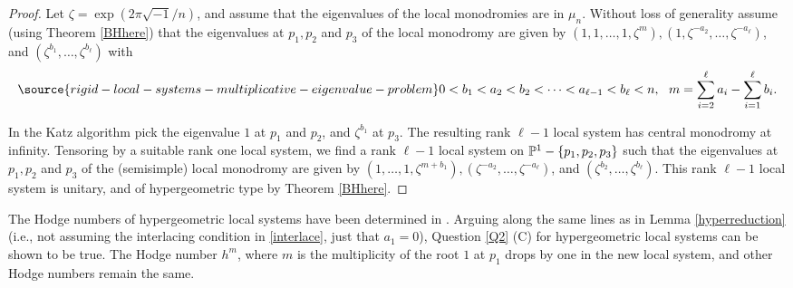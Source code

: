  \begin{proof}
Let $\zeta=\exp(2\pi\sqrt{-1}/n)$, and assume that the eigenvalues of the local monodromies are in $\mu_n$.  Without loss of generality assume (using Theorem \ref{BHhere}) that the eigenvalues at $p_1,p_2$ and $p_3$ of the local monodromy are given by $(1,1,\dots,1,\zeta^m), (1,\zeta^{-a_2},\dots,\zeta^{-a_{\ell}})$, and $(\zeta^{b_1},\dots,\zeta^{b_{\ell}})$ with
  \begin{equation}\label{interlace}
\source{rigid-local-systems-multiplicative-eigenvalue-problem}
  0<b_1<a_2<b_2<\dots<a_{\ell-1}<b_{\ell}<n, \ \ m=\sum_{i=2}^{\ell} a_i-\sum_{i=1}^\ell b_i.
  \end{equation}

In the Katz algorithm pick the eigenvalue $1$ at $p_1$ and $p_2$, and $\zeta^{b_1}$ at $p_3$. The resulting rank $\ell-1$  local system has central monodromy at infinity. Tensoring by a suitable rank one local system, we find a rank $\ell-1$ local system on $\Bbb{P}^1-\{p_1,p_2,p_3\}$ such that
the eigenvalues at $p_1,p_2$ and $p_3$ of the (semisimple) local monodromy are given by $(1,\dots,1,\zeta^{m+b_1}), (\zeta^{-a_2},\dots,\zeta^{-a_{\ell}})$, and $(\zeta^{b_2},\dots,\zeta^{b_{\ell}})$. This rank $\ell-1$ local system is unitary, and of hypergeometric type by Theorem \ref{BHhere}.
 \end{proof}
 \begin{remark}
\notready \label{Q2rem}
 The Hodge numbers of hypergeometric local systems have been determined in \cite{fedorov}. Arguing along the same lines as in Lemma \ref{hyperreduction} (i.e., not assuming the interlacing condition in \eqref{interlace}, just that $a_1=0$), Question \ref{Q2} (C) for hypergeometric local systems can be shown to be true. The Hodge number $h^m$, where $m$ is the multiplicity of the root $1$ at $p_1$ drops by one in the new local system, and other Hodge numbers remain the same.
\end{remark}

